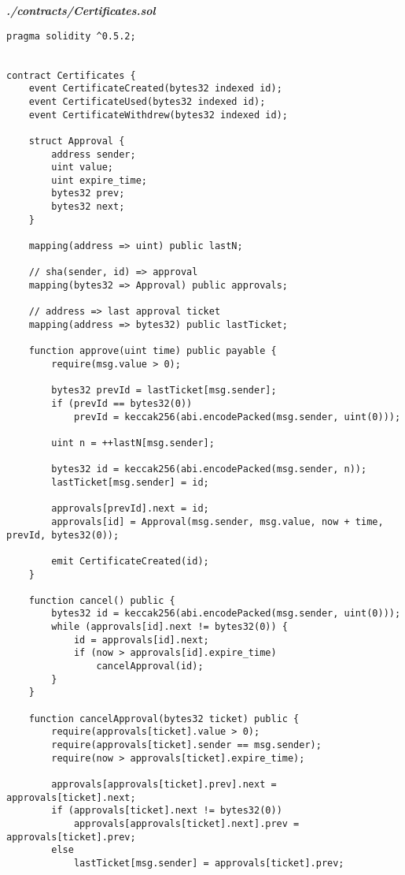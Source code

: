 \textit{\textbf{./contracts/Certificates.sol}}
\begin{verbatim}
pragma solidity ^0.5.2;


contract Certificates {
    event CertificateCreated(bytes32 indexed id);
    event CertificateUsed(bytes32 indexed id);
    event CertificateWithdrew(bytes32 indexed id);

    struct Approval {
        address sender;
        uint value;
        uint expire_time;
        bytes32 prev;
        bytes32 next;
    }

    mapping(address => uint) public lastN;

    // sha(sender, id) => approval
    mapping(bytes32 => Approval) public approvals;

    // address => last approval ticket
    mapping(address => bytes32) public lastTicket;

    function approve(uint time) public payable {
        require(msg.value > 0);

        bytes32 prevId = lastTicket[msg.sender];
        if (prevId == bytes32(0))
            prevId = keccak256(abi.encodePacked(msg.sender, uint(0)));

        uint n = ++lastN[msg.sender];

        bytes32 id = keccak256(abi.encodePacked(msg.sender, n));
        lastTicket[msg.sender] = id;

        approvals[prevId].next = id;
        approvals[id] = Approval(msg.sender, msg.value, now + time, prevId, bytes32(0));

        emit CertificateCreated(id);
    }

    function cancel() public {
        bytes32 id = keccak256(abi.encodePacked(msg.sender, uint(0)));
        while (approvals[id].next != bytes32(0)) {
            id = approvals[id].next;
            if (now > approvals[id].expire_time)
                cancelApproval(id);
        }
    }

    function cancelApproval(bytes32 ticket) public {
        require(approvals[ticket].value > 0);
        require(approvals[ticket].sender == msg.sender);
        require(now > approvals[ticket].expire_time);

        approvals[approvals[ticket].prev].next = approvals[ticket].next;
        if (approvals[ticket].next != bytes32(0))
            approvals[approvals[ticket].next].prev = approvals[ticket].prev;
        else
            lastTicket[msg.sender] = approvals[ticket].prev;


\end{verbatim}

